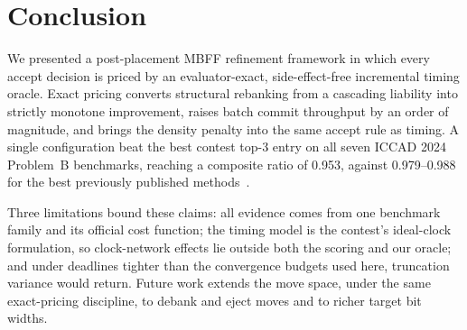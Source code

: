 \section{Conclusion}

We presented a post-placement MBFF refinement framework in which every accept decision is priced by an evaluator-exact, side-effect-free incremental timing oracle. Exact pricing converts structural rebanking from a cascading liability into strictly monotone improvement, raises batch commit throughput by an order of magnitude, and brings the density penalty into the same accept rule as timing. A single configuration beat the best contest top-3 entry on all seven ICCAD 2024 Problem~B benchmarks, reaching a composite ratio of 0.953, against 0.979--0.988 for the best previously published methods~\cite{li2025lbr,chen2026agile}.

Three limitations bound these claims: all evidence comes from one benchmark family and its official cost function; the timing model is the contest's ideal-clock formulation, so clock-network effects lie outside both the scoring and our oracle; and under deadlines tighter than the convergence budgets used here, truncation variance would return. Future work extends the move space, under the same exact-pricing discipline, to debank and eject moves and to richer target bit widths.
